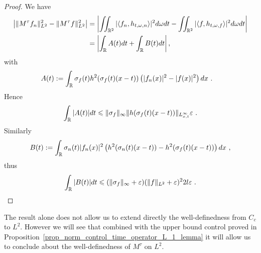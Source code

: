 \begin{proof}
    We have
    \begin{align*}
        \left| \|M^\tau f_n \|^2_{L^2} - \|M^\tau f\|^2_{L^2} \right| & = \left| \iint_{\mathbb{R}^2} |\langle f_n , h_{t,\omega,n}\rangle|^2 d\omega dt - \iint_{\mathbb{R}^2} |\langle f , h_{t,\omega,f}\rangle|^2 d\omega dt \right| \\
        & = \left| \int_{\mathbb{R}} A(t)dt + \int_{\mathbb{R}} B(t)dt \right|,
    \end{align*}
    with
    \begin{align*}
        A(t) &:= \int_{\mathbb{R}} \sigma_f(t)h^2(\sigma_f(t)(x-t))\left(|f_n(x)|^2-|f(x)|^2\right) dx\ .
    \end{align*}
    Hence
    \begin{equation*}
        \int_{\mathbb{R}} |A(t)|dt \leqslant \|\sigma_f\|_\infty \|h(\sigma_f(t)(x-t))\|_{L^\infty_{x,t}}\varepsilon\ .
    \end{equation*}
    Similarly 
    \begin{equation*}
    B(t):= \int_\R \sigma_n(t)|f_n(x)|^2\left(h^2(\sigma_n(t)(x-t))-h^2(\sigma_f(t)(x-t))\right)dx\ ,
    \end{equation*}
    thus
    \begin{equation*}
        \int_{\mathbb{R}} |B(t)|dt \leqslant (\|\sigma_f\|_\infty+\varepsilon)(\|f\|_{L^2}+\varepsilon)^2 2l\varepsilon\ .
    \end{equation*}
\end{proof}

The result alone does not allow us to extend directly the well-definedness from $C_c$ to $L^2$. However we will see that combined with the upper bound control proved in Proposition~\ref{prop_norm_control_time_operator_L_1_lemma} it will allow us to conclude about the well-definedness of $M^\tau$ on $L^2$.

